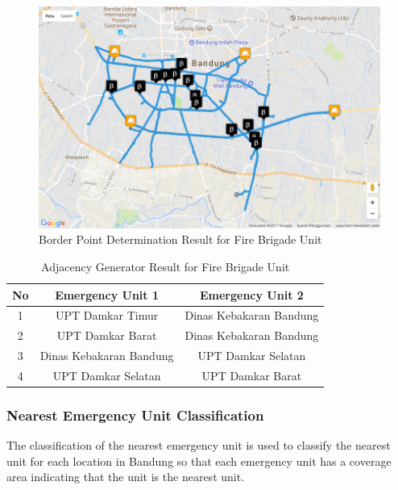 \pagebreak

\begin{figure}[H]
    \centering
    \includegraphics[scale=0.6]{v_border_point_fbg.png}
    \caption{Border Point Determination Result for Fire Brigade Unit}
    \label{fig:bp_fbg}
\end{figure}

\begin{table}[H]
\centering
\begin{tabular}{|c|c|c|}
\hline
\textbf{No} & \textbf{Emergency Unit 1} & \textbf{Emergency Unit 2} \\ \hline
1           & UPT Damkar Timur          & Dinas Kebakaran Bandung   \\ \hline
2           & UPT Damkar Barat          & Dinas Kebakaran Bandung   \\ \hline
3           & Dinas Kebakaran Bandung   & UPT Damkar Selatan        \\ \hline
4           & UPT Damkar Selatan        & UPT Damkar Barat          \\ \hline
\end{tabular}
\caption{Adjacency Generator Result for Fire Brigade Unit}
\label{table:adj_fbg}
\end{table}

\pagebreak
\subsubsection{Nearest Emergency Unit Classification}
The classification of the nearest emergency unit is used to classify the nearest unit for each location in Bandung so that each emergency unit has a coverage area indicating that the unit is the nearest unit. 

